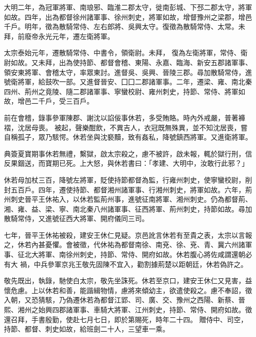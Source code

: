 \begin{pinyinscope}
 大明二年，為冠軍將軍、南琅邪、臨淮二郡太守，徙南彭城、下邳二郡太守，將軍如故。四年，出為都督徐州諸軍事、徐州刺史，將軍如故，增督豫州之梁郡，增邑千戶。明年，徵為散騎常侍、左右郎將、吳興太守。復徵為散騎常侍、太常。未拜，前廢帝永光元年，遷左衛將軍。



 太宗泰始元年，遷散騎常侍、中書令，領衛尉。未拜，
 復為左衛將軍，常侍、衛尉如故。又未拜，出為使持節、都督會稽、東陽、永嘉、臨海、新安五郡諸軍事、領安東將軍、會稽太守，率眾東討。進督吳、吳興、晉陵三郡。尋加散騎常侍，進號衛將軍，給鼓吹一部。又進督晉安、囗囗二郡諸軍事。二年，遷梁、雍、南北秦四州、荊州之竟陵、隨二郡諸軍事、寧蠻校尉、雍州刺史，持節、常侍、將軍如故，增邑二千戶，受三百戶。



 前在會稽，錄事參軍陳郡、謝沈以諂佞事休若，多受賄賂。時內外戒嚴，普著褲褶，沈居母喪。
 被起，聲樂酣飲，不異吉人，衣冠既無殊異，並不知沈居喪，嘗自稱孤子，眾乃駭愕。休若坐與沈褻黷，致有姦私，降號鎮西將軍。又進衛將軍。



 典簽夏寶期事休若無禮，繫獄，啟太宗殺之，慮不被許，啟未報，輒於獄行刑，信反果錮送，而寶期已死。上大怒，與休若書曰：「孝建、大明中，汝敢行此邪？」



 休若母加杖三百，降號左將軍，貶使持節都督為監，行雍州刺史，使寧蠻校尉，削封五百戶。四年，遷使持節、都督湘州諸軍事、行湘州刺史，將軍如故。六年，荊
 州刺史晉平王休祐入，以休若監荊州事，進號征南將軍、湘州刺史。仍為都督荊、湘、雍、益、梁、寧、南北秦八州諸軍事、征西將軍、荊州刺史，持節如故。尋加散騎常侍，又進號征西大將軍、開府儀同三司。



 七年，晉平王休祐被殺，建安王休仁見疑。京邑訛言休若有至貴之表，太宗以言報之，休若內甚憂懼。會被徵，代休祐為都督南徐、南兗、徐、兗、青、冀六州諸軍事、征北大將軍、南徐州刺史，持節、常侍、開府如故。休若腹心將佐咸謂還朝必有大
 禍，中兵參軍京兆王敬先固陳不宜入，勸割據荊楚以距朝廷，休若偽許之。



 敬先既出，執錄，馳使白太宗，敬先坐誅死。休若至京口，建安王休仁又見害，益懷危慮。上以休若和善，能諧緝物情，慮將來傾幼主，欲遣使殺之。慮不奉詔，徵入朝，又恐猜駭，乃偽遷休若為都督江郢、司、廣、交、豫州之西陽、新蔡、晉熙、湘州之始興四郡諸軍事、車騎大將軍、江州刺史，持節、常侍、開府如故。徵還召拜，手書殷勤，使赴七月七日，即於第賜死，時年二十四。
 贈侍中、司空，持節、都督、刺史如故，給班劍二十人，三望車一乘。




\end{pinyinscope}
